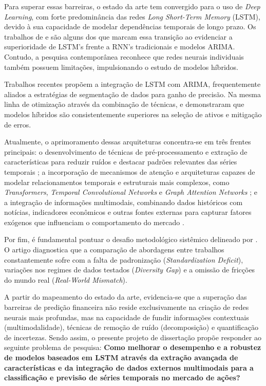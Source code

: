 \documentclass[12pt, a4paper, twoside]{article}
\begin{document}
Para superar essas barreiras, o estado da arte tem convergido para o uso de \textit{Deep Learning}, com forte predominância das redes \textit{Long Short-Term Memory} (LSTM), devido à sua capacidade de modelar dependências temporais de longo prazo. Os trabalhos de  e  são alguns dos que marcam essa transição ao evidenciar a superioridade de LSTM’s frente a RNN’s tradicionais e modelos ARIMA. Contudo, a pesquisa contemporânea reconhece que redes neurais individuais também possuem limitações, impulsionando o estudo de modelos híbridos.

Trabalhos recentes \cite{kiruba_risk_2025, ramkumar_development_2023} propõem a integração de LSTM com ARIMA, frequentemente aliados a estratégias de segmentação de dados para ganho de precisão. Na mesma linha de otimização através da combinação de técnicas,  e  demonstraram que modelos híbridos são consistentemente superiores na seleção de ativos e mitigação de erros.

Atualmente, o aprimoramento dessas arquiteturas concentra-se em três frentes principais: o desenvolvimento de técnicas de pré-processamento e extração de características para reduzir ruídos e destacar padrões relevantes das séries temporais \cite{sun_novel_2024, li_accurate_2024, hosseini_pattern-based_2025, wan_tcdformer_2024}; a incorporação de mecanismos de atenção e arquiteturas capazes de modelar relacionamentos temporais e estruturais mais complexos, como \textit{Transformers}, \textit{Temporal Convolutional Networks} e \textit{Graph Attention Networks} \cite{biswas_dual_2025, luo_short-term_2024, hsu_fingat_2023, anghinoni_time_2019}; e a integração de informações multimodais, combinando dados históricos com notícias, indicadores econômicos e outras fontes externas para capturar fatores exógenos que influenciam o comportamento do mercado \cite{choi_hybrid_2023, wang_stock_2023, haryono_transformer-gated_2023, anbaee_farimani_adaptive_2024}.

Por fim, é fundamental pontuar o desafio metodológico sistêmico delineado por . O artigo diagnostica que a comparação de abordagens entre trabalhos constantemente sofre com a falta de padronização (\textit{Standardization Deficit}), variações nos regimes de dados testados (\textit{Diversity Gap}) e a omissão de fricções do mundo real (\textit{Real-World Mismatch}).

A partir do mapeamento do estado da arte, evidencia-se que a superação das barreiras de predição financeira não reside exclusivamente na criação de redes neurais mais profundas, mas na capacidade de fundir informações contextuais (multimodalidade), técnicas de remoção de ruído (decomposição) e quantificação de incertezas. Sendo assim, o presente projeto de dissertação propõe responder ao seguinte problema de pesquisa: \textbf{Como melhorar o desempenho e a robustez de modelos baseados em LSTM através da extração avançada de características e da integração de dados externos multimodais para a classificação e previsão de séries temporais no mercado de ações?}
\end{document}
